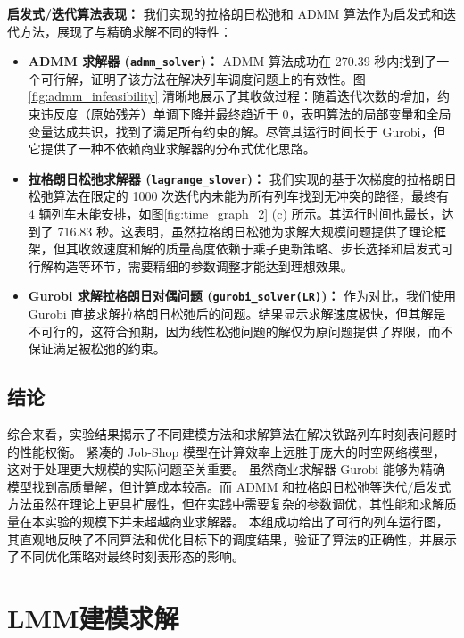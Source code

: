 \documentclass{article}
\begin{document}
    \textbf{启发式/迭代算法表现：}
    我们实现的拉格朗日松弛和 ADMM 算法作为启发式和迭代方法，展现了与精确求解不同的特性：
    \begin{itemize}
        \item \textbf{ADMM 求解器 (\texttt{admm\_solver})：} ADMM 算法成功在 270.39 秒内找到了一个可行解，证明了该方法在解决列车调度问题上的有效性。图 \ref{fig:admm_infeasibility} 清晰地展示了其收敛过程：随着迭代次数的增加，约束违反度（原始残差）单调下降并最终趋近于 0，表明算法的局部变量和全局变量达成共识，找到了满足所有约束的解。尽管其运行时间长于 Gurobi，但它提供了一种不依赖商业求解器的分布式优化思路。
        \item \textbf{拉格朗日松弛求解器 (\texttt{lagrange\_slover})：} 我们实现的基于次梯度的拉格朗日松弛算法在限定的 1000 次迭代内未能为所有列车找到无冲突的路径，最终有 4 辆列车未能安排，如图\ref{fig:time_graph_2} (c) 所示。其运行时间也最长，达到了 716.83 秒。这表明，虽然拉格朗日松弛为求解大规模问题提供了理论框架，但其收敛速度和解的质量高度依赖于乘子更新策略、步长选择和启发式可行解构造等环节，需要精细的参数调整才能达到理想效果。
        \item \textbf{Gurobi 求解拉格朗日对偶问题 (\texttt{gurobi\_solver(LR)})：} 作为对比，我们使用 Gurobi 直接求解拉格朗日松弛后的问题。结果显示求解速度极快，但其解是不可行的，这符合预期，因为线性松弛问题的解仅为原问题提供了界限，而不保证满足被松弛的约束。
    \end{itemize}

    \subsection{结论}
    综合来看，实验结果揭示了不同建模方法和求解算法在解决铁路列车时刻表问题时的性能权衡。 紧凑的 Job-Shop 模型在计算效率上远胜于庞大的时空网络模型，这对于处理更大规模的实际问题至关重要。
    虽然商业求解器 Gurobi 能够为精确模型找到高质量解，但计算成本较高。而 ADMM 和拉格朗日松弛等迭代/启发式方法虽然在理论上更具扩展性，但在实践中需要复杂的参数调优，其性能和求解质量在本实验的规模下并未超越商业求解器。
    本组成功给出了可行的列车运行图，其直观地反映了不同算法和优化目标下的调度结果，验证了算法的正确性，并展示了不同优化策略对最终时刻表形态的影响。


    \section{LMM建模求解}
\end{document}
